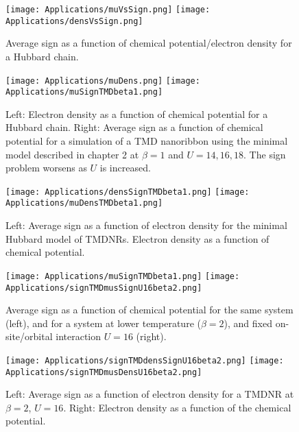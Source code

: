 \begin{figure}[H]
\texttt{[image: Applications/muVsSign.png]}
\texttt{[image: Applications/densVsSign.png]}
	\caption[Average sign as a function of chemical potential/electron density for a Hubbard chain.]{Average sign as a function of chemical potential/electron density for a Hubbard chain.}
	\label{fig:signMuDens}
\end{figure}
\begin{figure}[H]
\texttt{[image: Applications/muDens.png]}
\texttt{[image: Applications/muSignTMDbeta1.png]}
	\caption[Electron density as a function of chemical potential for a Hubbard chain. Average sign as a function of chemical potential for a simulation of a TMD nanoribbon using the minimal model described in chapter 2.]{Left: Electron density as a function of chemical potential for a Hubbard chain.
	Right: Average sign as a function of chemical potential for a simulation of a TMD nanoribbon using the minimal model described in chapter 2 at $\beta = 1$ and $U = 14, 16, 18$.
	The sign problem worsens as $U$ is increased.}
	\label{fig:muSign}
\end{figure}
\begin{figure}[H]
\texttt{[image: Applications/densSignTMDbeta1.png]}
\texttt{[image: Applications/muDensTMDbeta1.png]}
	\caption[Average sign as a function of electron density for the minimal Hubbard model of \acs{TMDNR}s. Electron density as a function of chemical potential.]{Left: Average sign as a function of electron density for the minimal Hubbard model of \acs{TMDNR}s. Electron density as a function of chemical potential.}
	\label{fig:densSignmuDens}
\end{figure}
\begin{figure}[H]
\texttt{[image: Applications/muSignTMDbeta1.png]}
\texttt{[image: Applications/signTMDmusSignU16beta2.png]}
	\caption[Average sign as a function of chemical potential for the same system, and for a system at lower temperature ($\beta = 2$), and fixed on-site/orbital interaction $U = 16$.]{Average sign as a function of chemical potential for the same system (left), and for a system at lower temperature ($\beta = 2$), and fixed on-site/orbital interaction $U = 16$ (right).}
	\label{fig:muDensU16signDens}
\end{figure}
\begin{figure}[H]
\texttt{[image: Applications/signTMDdensSignU16beta2.png]}
\texttt{[image: Applications/signTMDmusDensU16beta2.png]}
	\caption[Average sign as a function of electron density for the same \acs{TMDNR} at $\beta = 2$, $U = 16$. Electron density as a function of the chemical potential. ]{Left: Average sign as a function of electron density for a \acs{TMDNR} at $\beta = 2$, $U = 16$. Right: Electron density as a function of the chemical potential. }
	\label{fig:muDensU16}
\end{figure}

